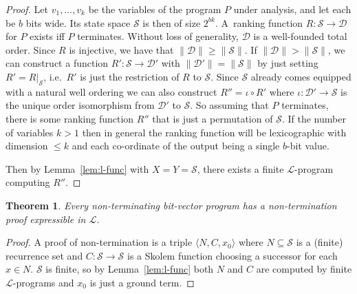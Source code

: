 \documentclass[preprint]{sigplanconf}
\newtheorem{theorem}{Theorem}
\theoremstyle{definition}
\begin{document}
\begin{proof}
%
Let $v_1, \ldots, v_k$ be the variables of the program $P$ under analysis,
and let each be $b$ bits wide.  Its state space $\mathcal{S}$ is then of
size $2^{bk}$.  A~ranking function $R: \mathcal{S} \to \mathcal{D}$ for $P$
exists iff $P$ terminates.  Without loss of generality,
$\mathcal{D}$ is a well-founded total order.  Since $R$ is injective, we have that $\|
\mathcal{D} \| \geq \| \mathcal{S} \|$.  If $\| \mathcal{D} \| > \|
\mathcal{S} \|$, we can construct a function $R': \mathcal{S} \to
\mathcal{D'}$ with $ \| \mathcal{D'} \| = \| \mathcal{S} \|$ by just setting
$R' = R|_\mathcal{S}$, i.e.~$R'$ is just the restriction of $R$ to
$\mathcal{S}$.  Since $\mathcal{S}$ already comes equipped with a natural
well ordering we can also construct $R'' = \iota \circ R'$ where $\iota:
\mathcal{D'} \to \mathcal{S}$ is the unique order isomorphism from
$\mathcal{D'}$ to $\mathcal{S}$.  So assuming that $P$ terminates, there is
some ranking function $R''$ that is just a permutation of $\mathcal{S}$.  If
the number of variables $k > 1$ then in general the ranking function will be
lexicographic with dimension $\leq k$ and each co-ordinate of the output
being a single $b$-bit value.

Then by Lemma~\ref{lem:l-func} with $X = Y = \mathcal{S}$, there exists
a finite $\mathcal{L}$-program computing $R''$.

%
\end{proof}

\begin{theorem}
\label{thm:l-nonterm}
 Every non-terminating bit-vector program has a non-termination proof expressible in $\mathcal{L}$.
\end{theorem}

\begin{proof}
 A proof of non-termination is a triple $\langle N, C, x_0 \rangle$ where
 \mbox{$N \subseteq \mathcal{S}$} is a (finite) recurrence set and
 $C : \mathcal{S} \to \mathcal{S}$ is a Skolem function choosing
 a successor for each $x \in N$.  $\mathcal{S}$ is finite, so by Lemma~\ref{lem:l-func} both
 $N$ and $C$ are computed by finite $\mathcal{L}$-programs and $x_0$ is just a ground term.
\end{proof}
\end{document}

